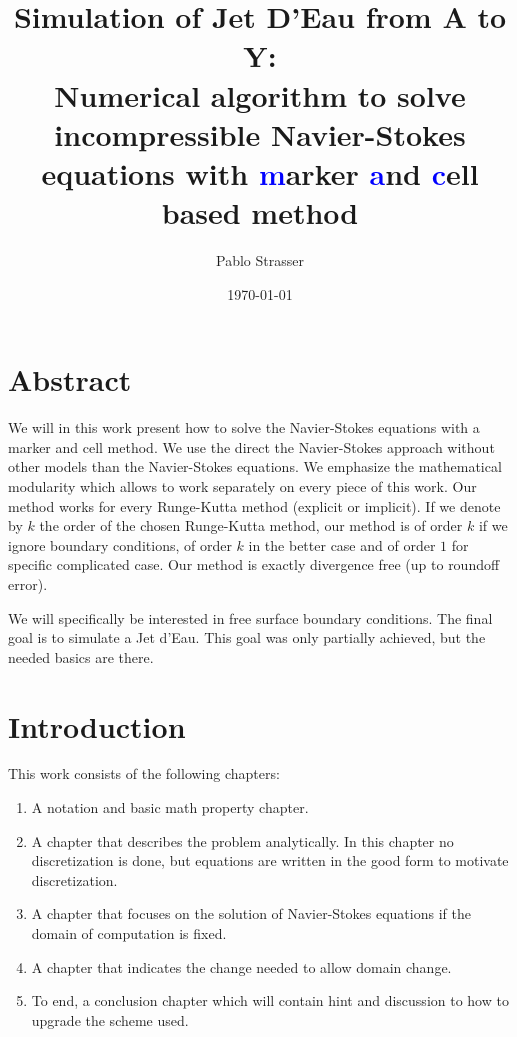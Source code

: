 \documentclass[a4paper]{master}
\title{Simulation of Jet D'Eau from A to Y:\\ Numerical algorithm to solve incompressible Navier-Stokes equations
with \textcolor{blue}{m}arker \textcolor{blue}{a}nd \textcolor{blue}{c}ell based method}
\author{Pablo Strasser}
\date{\today}
\begin{document}
\captionsetup{singlelinecheck=off,margin=10pt,font=small,labelfont=bf}
\maketitle
\dominitoc

\chapter*{Abstract}

\mtcaddchapter[Abstract]

We will in this work present how to solve the Navier-Stokes equations with a marker and cell method.
We use the direct the Navier-Stokes approach without other models than the Navier-Stokes equations.
We emphasize the mathematical modularity which allows to work separately on every piece of this work.
Our method works for every Runge-Kutta method (explicit or implicit). If we denote by $k$ the order of the chosen Runge-Kutta method,
our method is of order $k$ if we ignore boundary conditions, of order $k$ in the better case and of order $1$ for specific complicated case.
Our method is exactly divergence free (up to roundoff error).

We will specifically be interested in free surface boundary conditions. The final goal is to simulate a Jet d'Eau.
This goal was only partially achieved, but the needed basics are there. 


\tableofcontents

\chapter*{Introduction}

\mtcaddchapter[Introduction]

This work consists of the following chapters:
\begin{enumerate}
 \item A notation and basic math property chapter.
 \item A chapter that describes the problem analytically. In this chapter no discretization is done, but equations are written in the good form to motivate discretization.
 \item A chapter that focuses on the solution of Navier-Stokes equations if the domain of computation is fixed.
 \item A chapter that indicates the change needed to allow domain change.
 \item To end, a conclusion chapter which will contain hint and discussion to how to upgrade the scheme used.
\end{enumerate}
\end{document}
